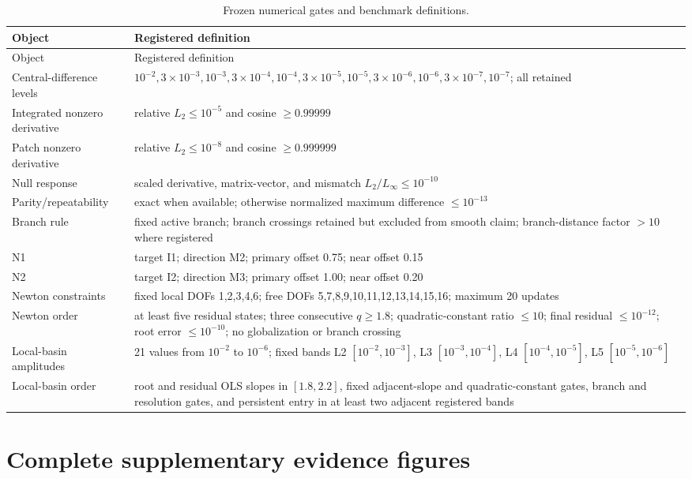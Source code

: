 \documentclass[preprint,12pt,authoryear]{elsarticle}
\begin{document}
\begin{longtable}{@{}p{}p{}@{}}
\caption{Frozen numerical gates and benchmark definitions.}\label{stab:gates}\\
\toprule
Object & Registered definition\\
\midrule
\endfirsthead
\toprule
Object & Registered definition\\
\midrule
\endhead
Central-difference levels & $10^{-2},3\times10^{-3},10^{-3},3\times10^{-4},10^{-4},3\times10^{-5},10^{-5},3\times10^{-6},10^{-6},3\times10^{-7},10^{-7}$; all retained\\
Integrated nonzero derivative & relative $L_2\le10^{-5}$ and cosine $\ge0.99999$\\
Patch nonzero derivative & relative $L_2\le10^{-8}$ and cosine $\ge0.999999$\\
Null response & scaled derivative, matrix-vector, and mismatch $L_2/L_\infty\le10^{-10}$\\
Parity/repeatability & exact when available; otherwise normalized maximum difference $\le10^{-13}$\\
Branch rule & fixed active branch; branch crossings retained but excluded from smooth claim; branch-distance factor $>10$ where registered\\
N1 & target I1; direction M2; primary offset 0.75; near offset 0.15\\
N2 & target I2; direction M3; primary offset 1.00; near offset 0.20\\
Newton constraints & fixed local DOFs 1,2,3,4,6; free DOFs 5,7,8,9,10,11,12,13,14,15,16; maximum 20 updates\\
Newton order & at least five residual states; three consecutive $q\ge1.8$; quadratic-constant ratio $\le10$; final residual $\le10^{-12}$; root error $\le10^{-10}$; no globalization or branch crossing\\
Local-basin amplitudes & 21 values from $10^{-2}$ to $10^{-6}$; fixed bands L2 $[10^{-2},10^{-3}]$, L3 $[10^{-3},10^{-4}]$, L4 $[10^{-4},10^{-5}]$, L5 $[10^{-5},10^{-6}]$\\
Local-basin order & root and residual OLS slopes in $[1.8,2.2]$, fixed adjacent-slope and quadratic-constant gates, branch and resolution gates, and persistent entry in at least two adjacent registered bands\\
\bottomrule
\end{longtable}

\section{Complete supplementary evidence figures}
\end{document}
